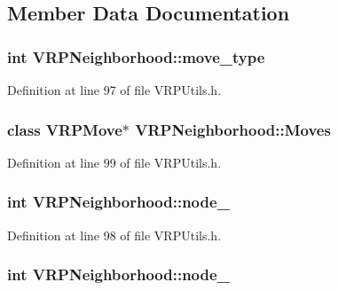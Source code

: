 \subsection{Member Data Documentation}
\hypertarget{class_v_r_p_neighborhood_a4bf5a8b2089c50abb1a7fd39f451640a}{
\subsubsection[{move\_\-type}]{\setlength{\rightskip}{0pt plus 5cm}int {\bf VRPNeighborhood::move\_\-type}}}
\label{class_v_r_p_neighborhood_a4bf5a8b2089c50abb1a7fd39f451640a}


Definition at line 97 of file VRPUtils.h.

\hypertarget{class_v_r_p_neighborhood_a84e4c61146ed7435fd6b3adae348edc6}{
\subsubsection[{Moves}]{\setlength{\rightskip}{0pt plus 5cm}class {\bf VRPMove}$\ast$ {\bf VRPNeighborhood::Moves}}}
\label{class_v_r_p_neighborhood_a84e4c61146ed7435fd6b3adae348edc6}


Definition at line 99 of file VRPUtils.h.

\hypertarget{class_v_r_p_neighborhood_a30c6abcf572da3a86e31e26985f1b671}{
\subsubsection[{node\_\-1}]{\setlength{\rightskip}{0pt plus 5cm}int {\bf VRPNeighborhood::node\_}}}
\label{class_v_r_p_neighborhood_a30c6abcf572da3a86e31e26985f1b671}


Definition at line 98 of file VRPUtils.h.

\hypertarget{class_v_r_p_neighborhood_afd3a215a79ef5241952a18fcd75d3602}{
\subsubsection[{node\_\-2}]{\setlength{\rightskip}{0pt plus 5cm}int {\bf VRPNeighborhood::node\_}}}
\label{class_v_r_p_neighborhood_afd3a215a79ef5241952a18fcd75d3602}


